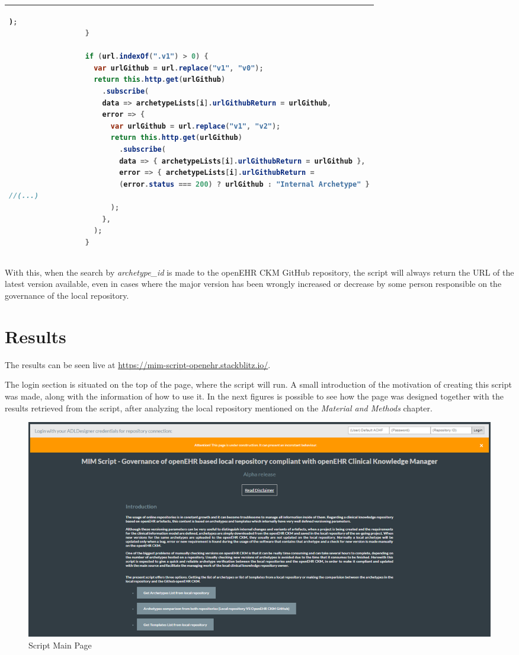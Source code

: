 \documentclass[mim_thesis.tex]{subfiles}
\begin{document}
\begin{table}[H]
\begin{tabular}{l}
\begin{lstlisting}[language=java]
                      );
                  }
                  
                  if (url.indexOf(".v1") > 0) {
                    var urlGithub = url.replace("v1", "v0");
                    return this.http.get(urlGithub)
                      .subscribe(
                      data => archetypeLists[i].urlGithubReturn = urlGithub,
                      error => {
                        var urlGithub = url.replace("v1", "v2");
                        return this.http.get(urlGithub)
                          .subscribe(
                          data => { archetypeLists[i].urlGithubReturn = urlGithub },
                          error => { archetypeLists[i].urlGithubReturn = 
                          (error.status === 200) ? urlGithub : "Internal Archetype" }
//(...)
                        );
                      },
                    );
                  }
\end{lstlisting}
\tabularnewline \bottomrule[2pt]
\end{tabular}
\end{table}

With this, when the search by \textit{archetype\_id} is made to the openEHR CKM GitHub repository, the script will always return the URL of the latest version available, even in cases where the major version has been wrongly increased or decrease by some person responsible on the governance of the local repository. 


\section{Results}

The results can be seen live at \url{https://mim-script-openehr.stackblitz.io/}.

The login section is situated on the top of the page, where the script will run. A small introduction of the motivation of creating this script was made, along with the information of how to use it. In the next figures is possible to see how the page was designed together with the results retrieved from the script, after analyzing the local repository mentioned on the \textit{Material and Methods} chapter. 

\begin{figure}[H]
	\centering
    \includegraphics[width=1\textwidth]{img/script_main_page.PNG}
	\caption{Script Main Page }
	\label{fig:script_main_page}
\end{figure}
\end{document}
